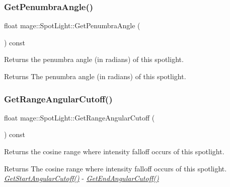 \subsubsection{\texorpdfstring{Get\+Penumbra\+Angle()}{GetPenumbraAngle()}}
{\footnotesize\ttfamily float mage\+::\+Spot\+Light\+::\+Get\+Penumbra\+Angle (\begin{DoxyParamCaption}{ }\end{DoxyParamCaption}) const\hspace{0.3cm}{\ttfamily [noexcept]}}

Returns the penumbra angle (in radians) of this spotlight.

\begin{DoxyReturn}{Returns}
The penumbra angle (in radians) of this spotlight. 
\end{DoxyReturn}
\hypertarget{classmage_1_1_spot_light_a330d2d426b6f29a3c3e30fe0219bb9f2}{}\label{classmage_1_1_spot_light_a330d2d426b6f29a3c3e30fe0219bb9f2} 
\subsubsection{\texorpdfstring{Get\+Range\+Angular\+Cutoff()}{GetRangeAngularCutoff()}}
{\footnotesize\ttfamily float mage\+::\+Spot\+Light\+::\+Get\+Range\+Angular\+Cutoff (\begin{DoxyParamCaption}{ }\end{DoxyParamCaption}) const\hspace{0.3cm}{\ttfamily [noexcept]}}

Returns the cosine range where intensity falloff occurs of this spotlight.

\begin{DoxyReturn}{Returns}
The cosine range where intensity falloff occurs of this spotlight. {\itshape \hyperlink{classmage_1_1_spot_light_ae221dd2747e65d01fcbf2a9b08c54abd}{Get\+Start\+Angular\+Cutoff()}} -\/ {\itshape \hyperlink{classmage_1_1_spot_light_a9e1ec369a3f42a4662c4cde2aa4a9ac4}{Get\+End\+Angular\+Cutoff()}} 
\end{DoxyReturn}
\hypertarget{classmage_1_1_spot_light_aa4d49da481b55080fff3e8f6094a6dcd}{}\label{classmage_1_1_spot_light_aa4d49da481b55080fff3e8f6094a6dcd} 
